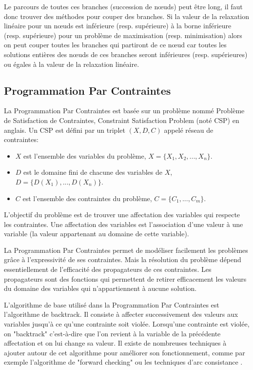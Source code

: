 Le parcours de toutes ces branches (succession de n\oe uds) peut être long, il faut donc trouver des méthodes pour couper des branches.
Si la valeur de la relaxation linéaire pour un n\oe uds est inférieure (resp. supérieure) à la borne inférieure (resp. supérieure) pour un problème de maximisation (resp. minimisation) alors on peut couper toutes les branches qui partiront de ce n\oe ud car toutes les solutions entières des n\oe uds de ces branches seront inférieures (resp. supérieures) ou égales à la valeur de la relaxation linéaire.



\subsection{Programmation Par Contraintes \label{subsec:CSP}}
La Programmation Par Contraintes est basée sur un problème nommé Problème de Satisfaction de Contraintes, Constraint Satisfaction Problem (noté CSP) en anglais. 
Un CSP est défini par un triplet $(X,D,C)$ appelé réseau de contraintes:
\begin{itemize}
\item $X$ est l'ensemble des variables du problème, $X=\{X_1,X_2,...,X_n\} $.
\item $D$ est le domaine fini de chacune des variables de $X$, $D= \{D(X_1),...,D(X_n)\}$.
\item $C$ est l'ensemble des contraintes du problème, $C=\{C_1,...,C_m\}$.
\end{itemize}

L'objectif du problème est de trouver une affectation des variables qui respecte les contraintes.
Une affectation des variables est l'association d'une valeur à une variable (la valeur appartenant au domaine de cette variable).

La Programmation Par Contraintes permet de modéliser facilement les problèmes grâce à l'expressivité de ses contraintes.
Mais la résolution du problème dépend essentiellement de l'efficacité des propagateurs de ces contraintes.
Les propagateurs sont des fonctions qui permettent de retirer efficacement les valeurs du domaine des variables qui n'appartiennent à aucune solution.

L'algorithme de base utilisé dans la Programmation Par Contraintes est l'algorithme de backtrack.
Il consiste à affecter successivement des valeurs aux variables jusqu'à ce qu'une contrainte soit violée. 
Lorsqu'une contrainte est violée, on "backtrack" c'est-à-dire que l'on revient à la variable de la précédente affectation et on lui change sa valeur.
Il existe de nombreuses techniques à ajouter autour de cet algorithme pour améliorer son fonctionnement, comme par exemple l'algorithme de "forward checking" ou les techniques d'arc consistance \cite{bessiere1994arc}.

